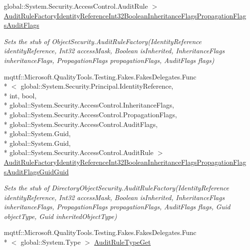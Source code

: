 \begin{DoxyCompactItemize}
global\-::\-System.\-Security.\-Access\-Control.\-Audit\-Rule $>$ \hyperlink{class_system_1_1_security_1_1_access_control_1_1_fakes_1_1_stub_directory_object_security_a45ec73a0fc9a54bb1504fcc8ae761945}{Audit\-Rule\-Factory\-Identity\-Reference\-Int32\-Boolean\-Inheritance\-Flags\-Propagation\-Flags\-Audit\-Flags}
\begin{DoxyCompactList}\small\item\em Sets the stub of Object\-Security.\-Audit\-Rule\-Factory(\-Identity\-Reference identity\-Reference, Int32 access\-Mask, Boolean is\-Inherited, Inheritance\-Flags inheritance\-Flags, Propagation\-Flags propagation\-Flags, Audit\-Flags flags)\end{DoxyCompactList}\item 
mqttf\-::\-Microsoft.\-Quality\-Tools.\-Testing.\-Fakes.\-Fakes\-Delegates.\-Func\\*
$<$ global\-::\-System.\-Security.\-Principal.\-Identity\-Reference, \\*
int, bool, \\*
global\-::\-System.\-Security.\-Access\-Control.\-Inheritance\-Flags, \\*
global\-::\-System.\-Security.\-Access\-Control.\-Propagation\-Flags, \\*
global\-::\-System.\-Security.\-Access\-Control.\-Audit\-Flags, \\*
global\-::\-System.\-Guid, \\*
global\-::\-System.\-Guid, \\*
global\-::\-System.\-Security.\-Access\-Control.\-Audit\-Rule $>$ \hyperlink{class_system_1_1_security_1_1_access_control_1_1_fakes_1_1_stub_directory_object_security_a306643011b8d57f21dc3080711e69aed}{Audit\-Rule\-Factory\-Identity\-Reference\-Int32\-Boolean\-Inheritance\-Flags\-Propagation\-Flags\-Audit\-Flags\-Guid\-Guid}
\begin{DoxyCompactList}\small\item\em Sets the stub of Directory\-Object\-Security.\-Audit\-Rule\-Factory(\-Identity\-Reference identity\-Reference, Int32 access\-Mask, Boolean is\-Inherited, Inheritance\-Flags inheritance\-Flags, Propagation\-Flags propagation\-Flags, Audit\-Flags flags, Guid object\-Type, Guid inherited\-Object\-Type)\end{DoxyCompactList}\item 
mqttf\-::\-Microsoft.\-Quality\-Tools.\-Testing.\-Fakes.\-Fakes\-Delegates.\-Func\\*
$<$ global\-::\-System.\-Type $>$ \hyperlink{class_system_1_1_security_1_1_access_control_1_1_fakes_1_1_stub_directory_object_security_ae78c38d41d1670852cfb5dedb2259236}{Audit\-Rule\-Type\-Get}

\end{DoxyCompactItemize}

